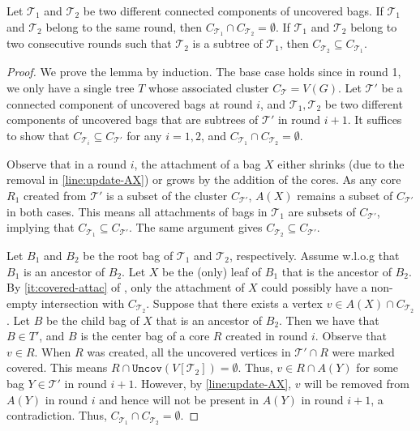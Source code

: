 \documentclass{article}
\newcommand{\mt}{\mathcal{T}}
\def\uncovset{\mathtt{Uncov}}
\def\core{R}
\begin{document}
\begin{lemma}\label{lm:hierarchy} Let $\mt_1$ and $\mt_2$ be two different connected components of uncovered bags. If $\mt_1$ and $\mt_2$  belong to the same round, then  $C_{\mt_1}\cap C_{\mt_2} = \emptyset$. If $\mt_1$ and $\mt_2$ belong to two consecutive rounds such that $\mt_2$ is a subtree of $\mt_1$, then $C_{\mt_2}\subseteq C_{\mt_1}$. 
\end{lemma}
\begin{proof}
	We prove the lemma by induction. The base case holds since in round 1, we only have a single tree $T$ whose associated cluster $C_{\mathcal{T}} = V(G)$.  Let $\mt'$ be a connected component of uncovered bags at round $i$, and $\mt_1,\mt_2$ be two different components of uncovered bags that are subtrees of $\mt'$ in round $i+1$.  It suffices to show that $C_{\mt_i}\subseteq C_{\mt'}$ for any $i = 1,2$, and $C_{\mt_1}\cap C_{\mt_2} = \emptyset$.
	
	Observe that in a round $i$, the attachment of a bag $X$ either shrinks (due to the removal in \cref{line:update-AX}) or grows by the addition of the cores. As any core  $\core_1$ created from $\mt'$ is a subset of the cluster $C_{\mt'}$, $A(X)$ remains a subset of  $C_{\mt'}$ in both cases. This means all attachments of bags in $\mt_1$ are subsets of $C_{\mt'}$, implying that $C_{\mt_1}\subseteq C_{\mt'}$. The same argument gives  $C_{\mt_2}\subseteq C_{\mt'}$.
	
	Let $B_1$ and $B_2$ be the root bag of $\mt_1$ and $\mt_2$, respectively. Assume w.l.o.g that $B_1$ is an ancestor of $B_2$. Let $X$ be the (only) leaf of $B_1$ that is the ancestor of $B_2$.  By \cref{it:covered-attac} of , only the attachment of $X$ could possibly have a non-empty intersection with $C_{\mt_2}$. Suppose that there exists a vertex $v\in A(X)\cap C_{\mt_2}$. Let $B$ be the child bag of $X$ that is an ancestor of $B_2$. Then we have that $B \in T'$, and $B$ is the center bag of a core $R$ created in round $i$. Observe that $v\in \core$. When $\core$ was created, all the uncovered vertices in $\mt' \cap \core$ were marked covered. This means $\core\cap \uncovset(V[\mt_2]) = \emptyset$. Thus,  $v\in \core \cap A(Y)$ for some bag $Y\in \mt'$ in round $i+1$. However, by \cref{line:update-AX}, $v$ will be removed from $A(Y)$ in round $i$ and hence will not be present in $A(Y)$ in round $i+1$, a contradiction. Thus,   $C_{\mt_1}\cap C_{\mt_2} = \emptyset$.
\end{proof}
\end{document}
